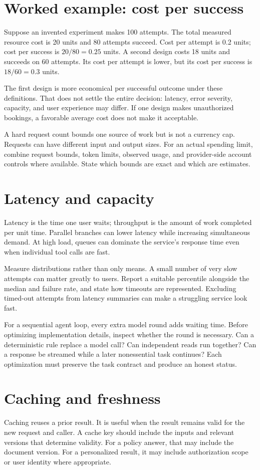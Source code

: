 \section{Worked example: cost per success}
Suppose an invented experiment makes 100 attempts. The total measured resource cost is 20 units and 80 attempts succeed. Cost per attempt is 0.2 units; cost per success is \(20/80=0.25\) units. A second design costs 18 units and succeeds on 60 attempts. Its cost per attempt is lower, but its cost per success is \(18/60=0.3\) units.

The first design is more economical per successful outcome under these definitions. That does not settle the entire decision: latency, error severity, capacity, and user experience may differ. If one design makes unauthorized bookings, a favorable average cost does not make it acceptable.

A hard request count bounds one source of work but is not a currency cap. Requests can have different input and output sizes. For an actual spending limit, combine request bounds, token limits, observed usage, and provider-side account controls where available. State which bounds are exact and which are estimates.

\section{Latency and capacity}
Latency is the time one user waits; throughput is the amount of work completed per unit time. Parallel branches can lower latency while increasing simultaneous demand. At high load, queues can dominate the service's response time even when individual tool calls are fast.

Measure distributions rather than only means. A small number of very slow attempts can matter greatly to users. Report a suitable percentile alongside the median and failure rate, and state how timeouts are represented. Excluding timed-out attempts from latency summaries can make a struggling service look fast.

For a sequential agent loop, every extra model round adds waiting time. Before optimizing implementation details, inspect whether the round is necessary. Can a deterministic rule replace a model call? Can independent reads run together? Can a response be streamed while a later nonessential task continues? Each optimization must preserve the task contract and produce an honest status.

\section{Caching and freshness}
Caching reuses a prior result. It is useful when the result remains valid for the new request and caller. A cache key should include the inputs and relevant versions that determine validity. For a policy answer, that may include the document version. For a personalized result, it may include authorization scope or user identity where appropriate.


